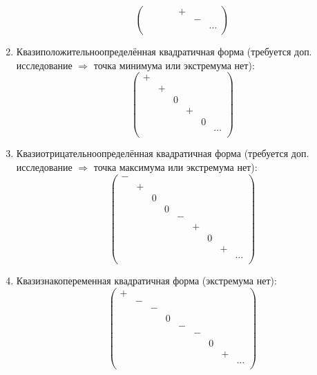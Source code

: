 \documentclass[12pt]{article}
\begin{document}
\begin{adjustwidth}{1.5em}{1.5em}
\begin{enumerate}
\[{\begin{pmatrix}
                & & & & + & & \\
                & & & & & - & \\
                & & & & & & \dots \\
            \end{pmatrix}} \]
            \item Квазиположительноопределённая квадратичная форма (требуется доп. исследование $\Rightarrow$ точка минимума или экстремума нет): \[ \begin{pmatrix}
                + & & & & & \\
                & + & & & & \\
                & & 0 & & & \\
                & & & + & & \\
                & & & & 0 & \\
                & & & & & \dots \\
            \end{pmatrix} \]
            \item Квазиотрицательноопределённая квадратичная форма (требуется доп. исследование $\Rightarrow$ точка максимума или экстремума нет): \[ \begin{pmatrix}
                - & & & & & & & & \\
                & + & & & & & & & \\
                & & 0 & & & & & & \\
                & & & 0 & & & & & \\
                & & & & - & & & & \\
                & & & & & + & & & \\
                & & & & & & 0 & & \\
                & & & & & & & + & \\
                & & & & & & & & \dots \\
            \end{pmatrix} \]
            \item Квазизнакопеременная квадратичная форма (экстремума нет): \[ \begin{pmatrix}
                + & & & & & & & & \\
                & - & & & & & & & \\
                & & - & & & & & & \\
                & & & 0 & & & & & \\
                & & & & - & & & & \\
                & & & & & - & & & \\
                & & & & & & 0 & & \\
                & & & & & & & + & \\
                & & & & & & & & \dots \\
            \end{pmatrix} \]
        \end{enumerate}
    \end{adjustwidth}
    
\end{document}
